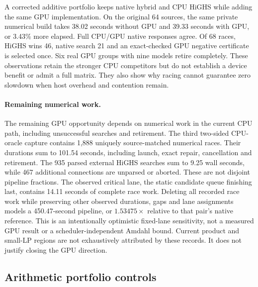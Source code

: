 \documentclass[10pt,twocolumn]{article}
\begin{document}
A corrected additive portfolio keeps native hybrid and CPU HiGHS while adding
the same GPU implementation. On the original 64 sources, the same private
numerical build takes 38.02 seconds without GPU and 39.33 seconds with GPU,
or 3.43\% more elapsed. Full CPU/GPU native responses agree. Of 68 races,
HiGHS wins 46, native search 21 and an exact-checked GPU negative certificate
is selected once. Six real GPU groups with nine models retire completely.
These observations retain the stronger CPU competitors but do not establish
a device benefit or admit a full matrix. They also show why racing cannot
guarantee zero slowdown when host overhead and contention remain.


\paragraph{Remaining numerical work.}
The remaining GPU opportunity depends on numerical work in the current CPU path, including unsuccessful searches and retirement. The third two-sided CPU-oracle capture contains 1,888 uniquely source-matched
numerical races. Their durations sum to 101.54 seconds, including launch,
exact repair, cancellation and retirement. The 935 parsed external HiGHS
searches sum to 9.25 wall seconds, while 467 additional connections are unparsed
or aborted. These are not disjoint pipeline fractions.
The observed critical lane, the static candidate queue finishing last, contains 14.11 seconds of complete race work.
Deleting all recorded race work while preserving other observed durations,
gaps and lane assignments models a 450.47-second pipeline, or
$1.53475\times$ relative to that pair's native reference.
This is an intentionally optimistic fixed-lane sensitivity, not a measured
GPU result or a scheduler-independent Amdahl bound. Current product and
small-LP regions are not exhaustively attributed by these records.
It does not justify closing the GPU direction.


\subsection{Arithmetic portfolio controls}
\end{document}
